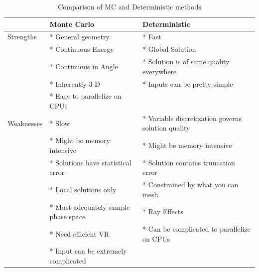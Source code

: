 \documentclass[12pt]{article}
\begin{document}
\begin{center}
\begin{table}
\caption{Comparison of MC and Deterministic methods}
\begin{tabu}{| l | X | X |}
  \hline
  & Monte Carlo         & Deterministic \\\hline
    Strengths & * General geometry    & * Fast \\
              & * Continuous Energy   & * Global Solution\\
              & * Continuous in Angle & * Solution is of same quality everywhere\\
              & * Inherently 3-D      & * Inputs can be pretty simple \\
              & * Easy to parallelize on CPUs & \\\hline
    Weaknesses & * Slow & * Variable discretization governs solution quality \\
               & * Might be memory intensive & * Might be memory intensive \\
               & * Solutions have statistical error & * Solution contains truncation error\\
               & * Local solutions only & * Constrained by what you can mesh \\
               & * Must adequately sample phase space & * Ray Effects \\
               & * Need efficient VR & * Can be complicated to parallelize on CPUs \\
               & * Input can be extremely complicated & \\\hline
\end{tabu}
\label{tab:comparison}
\end{table}
\end{center}
\end{document}
